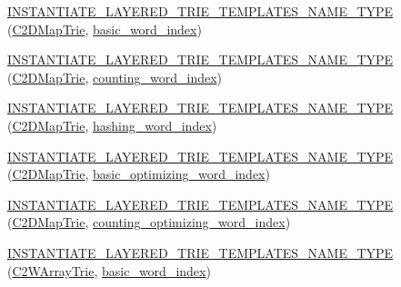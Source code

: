 \begin{DoxyCompactItemize}
\item 
\hyperlink{namespaceuva_1_1smt_1_1bpbd_1_1server_1_1lm_a7b98fd37179e4018136b129d68536f36}{I\+N\+S\+T\+A\+N\+T\+I\+A\+T\+E\+\_\+\+L\+A\+Y\+E\+R\+E\+D\+\_\+\+T\+R\+I\+E\+\_\+\+T\+E\+M\+P\+L\+A\+T\+E\+S\+\_\+\+N\+A\+M\+E\+\_\+\+T\+Y\+P\+E} (\hyperlink{classuva_1_1smt_1_1bpbd_1_1server_1_1lm_1_1_c2_d_map_trie}{C2\+D\+Map\+Trie}, \hyperlink{classuva_1_1smt_1_1bpbd_1_1server_1_1lm_1_1dictionary_1_1basic__word__index}{basic\+\_\+word\+\_\+index})
\item 
\hyperlink{namespaceuva_1_1smt_1_1bpbd_1_1server_1_1lm_a4b3921c8a642a01e5fb233c462b442cf}{I\+N\+S\+T\+A\+N\+T\+I\+A\+T\+E\+\_\+\+L\+A\+Y\+E\+R\+E\+D\+\_\+\+T\+R\+I\+E\+\_\+\+T\+E\+M\+P\+L\+A\+T\+E\+S\+\_\+\+N\+A\+M\+E\+\_\+\+T\+Y\+P\+E} (\hyperlink{classuva_1_1smt_1_1bpbd_1_1server_1_1lm_1_1_c2_d_map_trie}{C2\+D\+Map\+Trie}, \hyperlink{classuva_1_1smt_1_1bpbd_1_1server_1_1lm_1_1dictionary_1_1counting__word__index}{counting\+\_\+word\+\_\+index})
\item 
\hyperlink{namespaceuva_1_1smt_1_1bpbd_1_1server_1_1lm_a6ecace4591105de1a2096739692bdef2}{I\+N\+S\+T\+A\+N\+T\+I\+A\+T\+E\+\_\+\+L\+A\+Y\+E\+R\+E\+D\+\_\+\+T\+R\+I\+E\+\_\+\+T\+E\+M\+P\+L\+A\+T\+E\+S\+\_\+\+N\+A\+M\+E\+\_\+\+T\+Y\+P\+E} (\hyperlink{classuva_1_1smt_1_1bpbd_1_1server_1_1lm_1_1_c2_d_map_trie}{C2\+D\+Map\+Trie}, \hyperlink{classuva_1_1smt_1_1bpbd_1_1server_1_1lm_1_1dictionary_1_1hashing__word__index}{hashing\+\_\+word\+\_\+index})
\item 
\hyperlink{namespaceuva_1_1smt_1_1bpbd_1_1server_1_1lm_a40eb5a8260430666416fe6258e05572f}{I\+N\+S\+T\+A\+N\+T\+I\+A\+T\+E\+\_\+\+L\+A\+Y\+E\+R\+E\+D\+\_\+\+T\+R\+I\+E\+\_\+\+T\+E\+M\+P\+L\+A\+T\+E\+S\+\_\+\+N\+A\+M\+E\+\_\+\+T\+Y\+P\+E} (\hyperlink{classuva_1_1smt_1_1bpbd_1_1server_1_1lm_1_1_c2_d_map_trie}{C2\+D\+Map\+Trie}, \hyperlink{namespaceuva_1_1smt_1_1bpbd_1_1server_1_1lm_1_1dictionary_a3001583c904eec702b4a4125082a7ecd}{basic\+\_\+optimizing\+\_\+word\+\_\+index})
\item 
\hyperlink{namespaceuva_1_1smt_1_1bpbd_1_1server_1_1lm_afa34e5d5c10f69a93c34a51468a1df11}{I\+N\+S\+T\+A\+N\+T\+I\+A\+T\+E\+\_\+\+L\+A\+Y\+E\+R\+E\+D\+\_\+\+T\+R\+I\+E\+\_\+\+T\+E\+M\+P\+L\+A\+T\+E\+S\+\_\+\+N\+A\+M\+E\+\_\+\+T\+Y\+P\+E} (\hyperlink{classuva_1_1smt_1_1bpbd_1_1server_1_1lm_1_1_c2_d_map_trie}{C2\+D\+Map\+Trie}, \hyperlink{namespaceuva_1_1smt_1_1bpbd_1_1server_1_1lm_1_1dictionary_a61cbd647b15de785ccf4cdd26661c366}{counting\+\_\+optimizing\+\_\+word\+\_\+index})
\item 
\hyperlink{namespaceuva_1_1smt_1_1bpbd_1_1server_1_1lm_a4ed5de41f1b244dbd8d07da300f43ed7}{I\+N\+S\+T\+A\+N\+T\+I\+A\+T\+E\+\_\+\+L\+A\+Y\+E\+R\+E\+D\+\_\+\+T\+R\+I\+E\+\_\+\+T\+E\+M\+P\+L\+A\+T\+E\+S\+\_\+\+N\+A\+M\+E\+\_\+\+T\+Y\+P\+E} (\hyperlink{classuva_1_1smt_1_1bpbd_1_1server_1_1lm_1_1_c2_w_array_trie}{C2\+W\+Array\+Trie}, \hyperlink{classuva_1_1smt_1_1bpbd_1_1server_1_1lm_1_1dictionary_1_1basic__word__index}{basic\+\_\+word\+\_\+index})

\end{DoxyCompactItemize}
